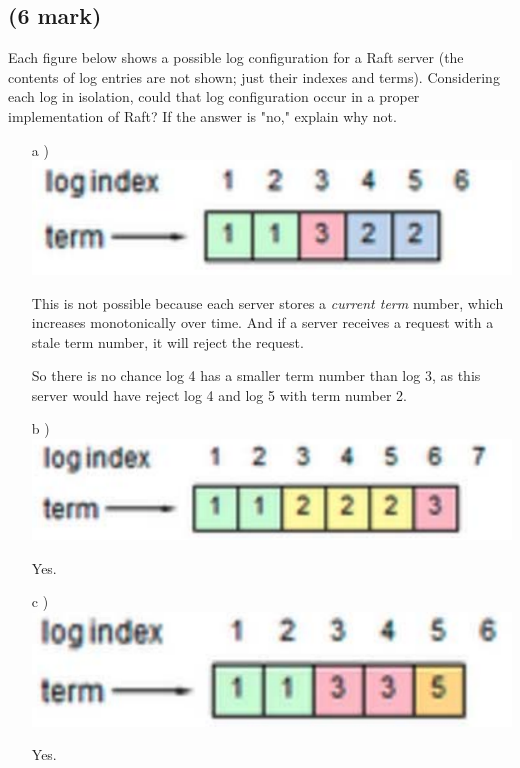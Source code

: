\documentclass[11pt]{article}
\begin{document}
\subsection{(6 mark)}
Each figure below shows a possible log configuration for a Raft server (the contents of log
entries are not shown; just their indexes and terms). Considering each log in isolation, could that
log configuration occur in a proper implementation of Raft? If the answer is "no," explain why
not.
\begin{enumerate}
	\item[a])\\ \includegraphics[width=\linewidth/3]{q6a.png}
	
	This is not possible because each server stores a \textit{current term} number, which increases monotonically over time. And if a server receives a request with a stale term number, it will reject the request.
	
	So there is no chance log 4 has a smaller term number than log 3, as this server would have reject log 4 and log 5 with term number 2.
	
	\item[b])\\ \includegraphics[width=\linewidth/3]{q6b.png}
	
	Yes.
	
	\item[c])\\ \includegraphics[width=\linewidth/3]{q6c.png}
	
	Yes.
	
\end{enumerate}
\end{document}
